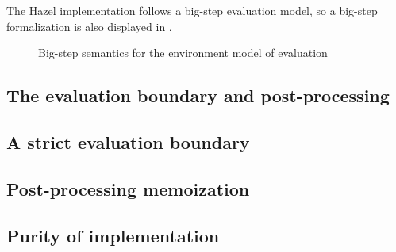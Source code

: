 The Hazel implementation follows a big-step evaluation model, so a big-step formalization is also displayed in .

\begin{figure}
  \centering
  \begin{mdframed}
    \begin{singlespace}
      
    \end{singlespace}
  \end{mdframed}
  \caption{Big-step semantics for the environment model of evaluation}
  \label{fig:big-step-formal}
\end{figure}




\subsection{The evaluation boundary and post-processing}
\label{sec:closures_to_lambdas}


\subsection{A strict evaluation boundary}
\label{sec:strict_eval_boundary}

\subsection{Post-processing memoization}
\label{sec:memoization}

\subsection{Purity of implementation}
\label{sec:env_purity}

